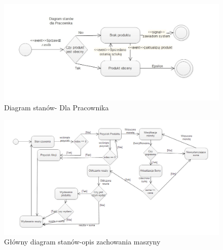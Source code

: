 \documentclass[a4paper, 11pt]{article}
\begin{document}
\begin{figure}[H]
\centerline{\includegraphics[scale=0.9]{../Diagrams/stanyPracownik}}
\caption{Diagram stanów- Dla Pracownika}
\end{figure}

\begin{figure}[H]
\centerline{\includegraphics[scale=0.7]{../Diagrams/StanVending}}
\caption{Główny diagram stanów-opis zachowania maszyny}
\end{figure}
\end{document}
